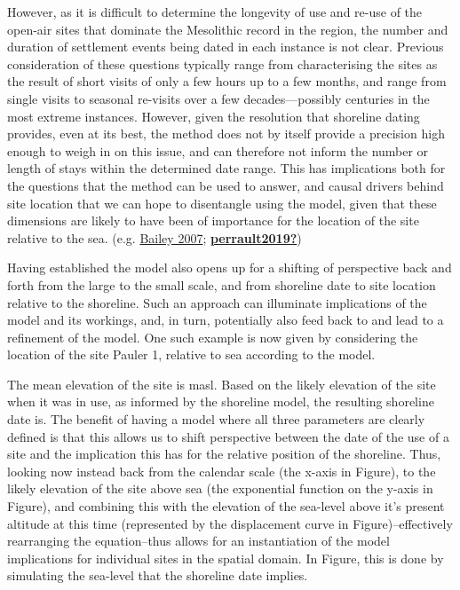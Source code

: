 \documentclass[
  a4paper,
  oneside]{uiophdthesis}
\begin{document}
However, as it is difficult to determine the longevity of use and re-use of the open-air sites that dominate the Mesolithic record in the region, the number and duration of settlement events being dated in each instance is not clear. Previous consideration of these questions typically range from characterising the sites as the result of short visits of only a few hours up to a few months, and range from single visits to seasonal re-visits over a few decades---possibly centuries in the most extreme instances. However, given the resolution that shoreline dating provides, even at its best, the method does not by itself provide a precision high enough to weigh in on this issue, and can therefore not inform the number or length of stays within the determined date range. This has implications both for the questions that the method can be used to answer, and causal drivers behind site location that we can hope to disentangle using the model, given that these dimensions are likely to have been of importance for the location of the site relative to the sea. (e.g. \protect\hyperlink{ref-bailey2007}{Bailey 2007}; \protect\hyperlink{ref-perrault2019}{\textbf{perrault2019?}})

Having established the model also opens up for a shifting of perspective back and forth from the large to the small scale, and from shoreline date to site location relative to the shoreline. Such an approach can illuminate implications of the model and its workings, and, in turn, potentially also feed back to and lead to a refinement of the model. One such example is now given by considering the location of the site Pauler 1, relative to sea according to the model.

The mean elevation of the site is masl. Based on the likely elevation of the site when it was in use, as informed by the shoreline model, the resulting shoreline date is. The benefit of having a model where all three parameters are clearly defined is that this allows us to shift perspective between the date of the use of a site and the implication this has for the relative position of the shoreline. Thus, looking now instead back from the calendar scale (the x-axis in Figure), to the likely elevation of the site above sea (the exponential function on the y-axis in Figure), and combining this with the elevation of the sea-level above it's present altitude at this time (represented by the displacement curve in Figure)--effectively rearranging the equation--thus allows for an instantiation of the model implications for individual sites in the spatial domain. In Figure, this is done by simulating the sea-level that the shoreline date implies.
\end{document}
